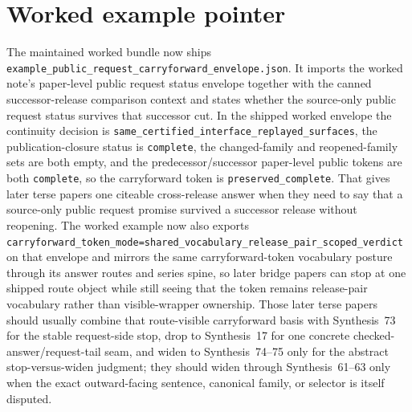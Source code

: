\documentclass[11pt]{article}
\begin{document}
\section{Worked example pointer}
The maintained worked bundle now ships \nolinkurl{example_public_request_carryforward_envelope.json}.\cite{series:workedexample}
It imports the worked note's paper-level public request status envelope together with the canned successor-release comparison context and states whether the source-only public request status survives that successor cut. In the shipped worked envelope the continuity decision is \texttt{same\_certified\_interface\_replayed\_surfaces}, the publication-closure status is \texttt{complete}, the changed-family and reopened-family sets are both empty, and the predecessor/successor paper-level public tokens are both \texttt{complete}, so the carryforward token is \texttt{preserved\_complete}.
That gives later terse papers one citeable cross-release answer when they need to say that a source-only public request promise survived a successor release without reopening. The worked example now also exports \texttt{carryforward\_token\_mode=shared\_vocabulary\_release\_pair\_scoped\_verdict} on that envelope and mirrors the same carryforward-token vocabulary posture through its answer routes and series spine, so later bridge papers can stop at one shipped route object while still seeing that the token remains release-pair vocabulary rather than visible-wrapper ownership. Those later terse papers should usually combine that route-visible carryforward basis with Synthesis~73 for the stable request-side stop, drop to Synthesis~17 for one concrete checked-answer/request-tail seam, and widen to Synthesis~74--75 only for the abstract stop-versus-widen judgment; they should widen through Synthesis~61--63 only when the exact outward-facing sentence, canonical family, or selector is itself disputed.\cite{series:publicrequestnotices,series:publicrequestnoticenormalforms,series:publicrequestnoticeselections,series:publicrequestresponsepacketrefreshresponsepacketclosureverdicts,series:pairedterminalcitationdiscipline,series:pairedterminalcutoverrule}
\end{document}
